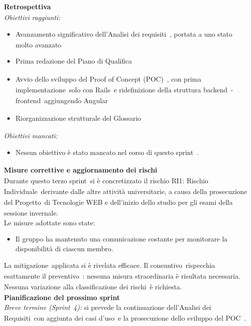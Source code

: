 \documentclass[a4paper,12pt]{article}
\newcommand{\pediceG}{\texorpdfstring{\textsubscript{\scalebox{0.6}{\textbf{G}}}~}{G}}
\begin{document}
\noindent\textbf{Retrospettiva\pediceG}\\
\textit{Obiettivi raggiunti:}
\begin{itemize}
    \item Avanzamento significativo dell'Analisi dei requisiti\pediceG, portata a uno stato molto avanzato
    \item Prima redazione del Piano di Qualifica\pediceG
    \item Avvio dello sviluppo del Proof of Concept (POC)\pediceG, con prima implementazione\pediceG solo con Rails\pediceG e ridefinizione della struttura backend\pediceG-frontend\pediceG aggiungendo Angular\pediceG
    \item Riorganizzazione strutturale del Glossario\pediceG
\end{itemize}
\textit{Obiettivi mancati:}
\begin{itemize}
    \item Nessun obiettivo è stato mancato nel corso di questo sprint\pediceG.
\end{itemize}

\noindent\textbf{Misure correttive e aggiornamento dei rischi\pediceG}\\
Durante questo terzo sprint\pediceG si è concretizzato il rischio RI1: Rischio Individuale\pediceG derivante dalle altre attività universitarie, a causa della prosecuzione del Progetto\pediceG di Tecnologie WEB e dell'inizio dello studio per gli esami della sessione invernale.\\

Le misure adottate sono state:
\begin{itemize}
    \item Il gruppo ha mantenuto una comunicazione costante per monitorare la disponibilità di ciascun membro.
\end{itemize}

La mitigazione\pediceG applicata si è rivelata efficace. Il consuntivo\pediceG rispecchia esattamente il preventivo\pediceG: nessuna misura straordinaria è risultata necessaria. Nessuna variazione alla classificazione dei rischi\pediceG è richiesta.\\

\noindent\textbf{Pianificazione del prossimo sprint}\\
\textit{Breve termine (Sprint\pediceG 4):} si prevede la continuazione dell'Analisi dei Requisiti\pediceG con aggiunta dei casi d'uso\pediceG e la prosecuzione dello sviluppo del POC\pediceG. \\
\end{document}
